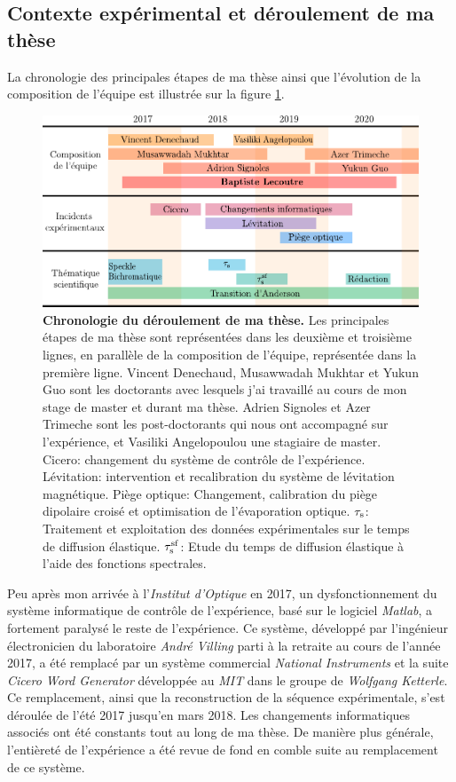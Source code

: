 \subsection{Contexte expérimental et déroulement de ma thèse}
La chronologie des principales étapes de ma thèse ainsi que l'évolution de la composition de l'équipe est illustrée sur la figure \ref{fig:chronologie}.

\begin{figure}
\centering
\includegraphics[width=\textwidth]{Fig/Introduction/chronologie.pdf}
\caption{\textbf{Chronologie du déroulement de ma thèse.} Les principales étapes de ma thèse sont représentées dans les deuxième et troisième lignes, en parallèle de la composition de l'équipe, représentée dans la première ligne. Vincent Denechaud, Musawwadah Mukhtar et Yukun Guo sont les doctorants avec lesquels j'ai travaillé au cours de mon stage de master et durant ma thèse. Adrien Signoles et Azer Trimeche sont les post-doctorants qui nous ont accompagné sur l'expérience, et Vasiliki Angelopoulou une stagiaire de master. Cicero: changement du système de contrôle de l'expérience. Lévitation: intervention et recalibration du système de lévitation magnétique. Piège optique: Changement, calibration du piège dipolaire croisé et optimisation de l'évaporation optique. $\tau_{\mathrm{s}}$: Traitement et exploitation des données expérimentales sur le temps de diffusion élastique. $\tau_{\mathrm{s}}^{\mathrm{sf}}$: Etude du temps de diffusion élastique à l'aide des fonctions spectrales. }
\label{fig:chronologie}
\end{figure}


Peu après mon arrivée à l'\emph{Institut d'Optique} en 2017, un dysfonctionnement du système informatique de contrôle de l'expérience, basé sur le logiciel \emph{Matlab}, a fortement paralysé le reste de l'expérience. Ce système, développé par l'ingénieur électronicien du laboratoire \emph{André Villing} parti à la retraite au cours de l'année 2017, a été remplacé par un système commercial \emph{National Instruments} et la suite \emph{Cicero Word Generator} développée au \emph{MIT} dans le groupe de \emph{Wolfgang Ketterle}. Ce remplacement, ainsi que la reconstruction de la séquence expérimentale, s'est déroulée de l'été 2017 jusqu'en mars 2018. Les changements informatiques associés ont été constants tout au long de ma thèse. De manière plus générale, l'entièreté de l'expérience a été revue de fond en comble suite au remplacement de ce système.



